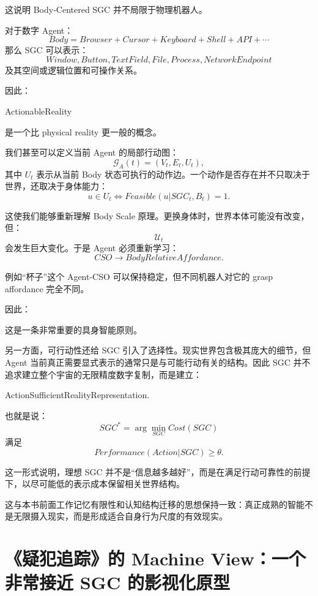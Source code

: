 这说明 Body-Centered SGC 并不局限于物理机器人。

对于数字 Agent：
\[
Body
=
Browser+Cursor+Keyboard+Shell+API+\cdots
\]
那么 SGC 可以表示：
\[
Window,
Button,
TextField,
File,
Process,
NetworkEndpoint
\]
及其空间或逻辑位置和可操作关系。

因此：
\begin{statementbox}
ActionableReality
\end{statementbox}
是一个比 physical reality 更一般的概念。

我们甚至可以定义当前 Agent 的局部行动图：
\[
\mathcal G_A(t)
=
(V_t,E_t,U_t),
\]
其中 \(U_t\) 表示从当前 Body 状态可执行的动作边。一个动作是否存在并不只取决于世界，还取决于身体能力：
\[
u\in U_t
\iff
Feasible(u|SGC_t,B_t)=1.
\]

这使我们能够重新理解 Body Scale 原理。更换身体时，世界本体可能没有改变，但：
\[
\mathcal U_t
\]
会发生巨大变化。于是 Agent 必须重新学习：
\[
CSO
\rightarrow
BodyRelativeAffordance.
\]

例如“杯子”这个 Agent-CSO 可以保持稳定，但不同机器人对它的 grasp affordance 完全不同。

因此：
\begin{statementbox}
\centering
{}
\end{statementbox}

这是一条非常重要的具身智能原则。

另一方面，可行动性还给 SGC 引入了选择性。现实世界包含极其庞大的细节，但 Agent 当前真正需要显式表示的通常只是与可能行动有关的结构。因此 SGC 并不追求建立整个宇宙的无限精度数字复制，而是建立：
\begin{statementbox}
ActionSufficientRealityRepresentation.
\end{statementbox}

也就是说：
\[
SGC^\ast
=
\arg\min_{SGC}
Cost(SGC)
\]
满足
\[
Performance(
Action|SGC
)
\geq
\theta.
\]

这一形式说明，理想 SGC 并不是“信息越多越好”，而是在满足行动可靠性的前提下，以尽可能低的表示成本保留相关世界结构。

这与本书前面工作记忆有限性和认知结构迁移的思想保持一致：真正成熟的智能不是无限摄入现实，而是形成适合自身行为尺度的有效现实。

\section{《疑犯追踪》的 Machine View：一个非常接近 SGC 的影视化原型}

